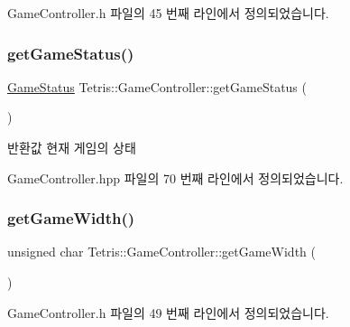 Game\+Controller.\+h 파일의 45 번째 라인에서 정의되었습니다.

\mbox{\label{class_tetris_1_1_game_controller_a3b95b1b7a3a18c27402100f70c1ac1ab}} 
\subsubsection{\texorpdfstring{get\+Game\+Status()}{getGameStatus()}\hspace{0.1cm}{\footnotesize\ttfamily [2/2]}}
{\footnotesize\ttfamily \hyperlink{class_tetris_1_1_game_controller_a96a963b56385f3b3a122ff0ca2beb770}{Game\+Status} Tetris\+::\+Game\+Controller\+::get\+Game\+Status (\begin{DoxyParamCaption}{ }\end{DoxyParamCaption})\hspace{0.3cm}{\ttfamily [inline]}}

\begin{DoxyReturn}{반환값}
현재 게임의 상태 
\end{DoxyReturn}


Game\+Controller.\+hpp 파일의 70 번째 라인에서 정의되었습니다.

\mbox{\label{class_tetris_1_1_game_controller_a256cff75224efe165e1c5409c69b0503}} 
\subsubsection{\texorpdfstring{get\+Game\+Width()}{getGameWidth()}\hspace{0.1cm}{\footnotesize\ttfamily [1/2]}}
{\footnotesize\ttfamily unsigned char Tetris\+::\+Game\+Controller\+::get\+Game\+Width (\begin{DoxyParamCaption}{ }\end{DoxyParamCaption})\hspace{0.3cm}{\ttfamily [inline]}}



Game\+Controller.\+h 파일의 49 번째 라인에서 정의되었습니다.

